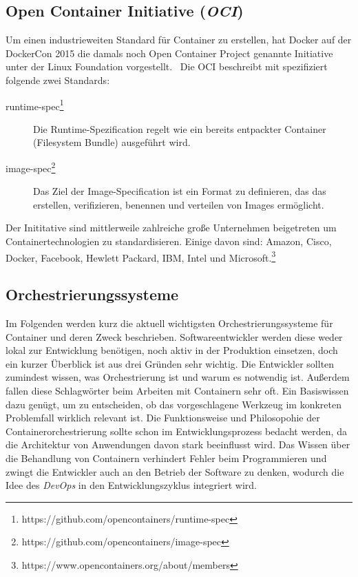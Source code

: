 \subsection{Open Container Initiative (\emph{OCI})}
\label{sec:open-container-initiative}
Um einen industrieweiten Standard für Container zu erstellen, hat Docker auf der DockerCon 2015 die damals noch Open Container Project genannte Initiative unter der Linux Foundation vorgestellt.~\autocite{docker-ocp:online}
Die OCI beschreibt mit \autocite{oci-about:online} spezifiziert folgende zwei Standards:
\begin{description}
    \item [runtime-spec\footnote{https://github.com/opencontainers/runtime-spec}] Die Runtime-Spezification regelt wie ein bereits entpackter Container (Filesystem Bundle) ausgeführt wird.
    \item [image-spec\footnote{https://github.com/opencontainers/image-spec}] Das Ziel der Image-Specification ist ein Format zu definieren, das das erstellen, verifizieren, benennen und verteilen von Images ermöglicht.
\end{description}
Der Inititative sind mittlerweile zahlreiche große Unternehmen beigetreten um Containertechnologien zu standardisieren. Einige davon sind: Amazon, Cisco, Docker, Facebook, Hewlett Packard, IBM, Intel und Microsoft.\footnote{https://www.opencontainers.org/about/members}

\subsection{Orchestrierungssysteme}
\label{sec:orchestrierungssysteme}
Im Folgenden werden kurz die aktuell wichtigsten Orchestrierungssysteme für Container und deren Zweck beschrieben.
Softwareentwickler werden diese weder lokal zur Entwicklung benötigen, noch aktiv in der Produktion einsetzen, doch ein kurzer Überblick ist aus drei Gründen sehr wichtig.
Die Entwickler sollten zumindest wissen, was Orchestrierung ist und warum es notwendig ist.
Außerdem fallen diese Schlagwörter beim Arbeiten mit Containern sehr oft. Ein Basiswissen dazu genügt, um zu entscheiden, ob das vorgeschlagene Werkzeug im konkreten Problemfall wirklich relevant ist.
Die Funktionsweise und Philosopohie der Containerorchestrierung sollte schon im Entwicklungsprozess bedacht werden, da die Architektur von Anwendungen davon stark beeinflusst wird.
Das Wissen über die Behandlung von Containern verhindert Fehler beim Programmieren und zwingt die Entwickler auch an den Betrieb der Software zu denken, wodurch die Idee des \emph{DevOps} in den Entwicklungszyklus integriert wird.

